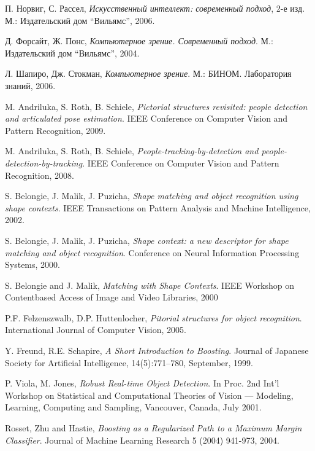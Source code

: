 \begin{thebibliography}{99}

  П. Норвиг, С. Рассел,
  \emph{Искусственный интеллект: современный подход}, 2-е изд.
  М.: Издательский дом ``Вильямс'',
  2006.

  Д. Форсайт, Ж. Понс,
  \emph{Компьютерное зрение. Современный подход}.
  М.: Издательский дом ``Вильямс'',
  2004.

  Л. Шапиро, Дж. Стокман,
  \emph{Компьютерное зрение}.
  М.: БИНОМ. Лаборатория знаний,
  2006.

  M. Andriluka, S. Roth, B. Schiele,
  \emph{Pictorial structures revisited: people detection and articulated pose estimation}.
  IEEE Conference on Computer Vision and Pattern Recognition,
  2009.

  M. Andriluka, S. Roth, B. Schiele,
  \emph{People-tracking-by-detection and people-detection-by-tracking}.
  IEEE Conference on Computer Vision and Pattern Recognition,
  2008.

  S. Belongie, J. Malik, J. Puzicha,
  \emph{Shape matching and object recognition using shape contexts}.
  IEEE Transactions on Pattern Analysis and Machine Intelligence,
  2002.

  S. Belongie, J. Malik, J. Puzicha,
  \emph{Shape context: a new descriptor for shape matching and object recognition}.
  Conference on Neural Information Processing Systems,
  2000.

  S. Belongie and J. Malik,
  \emph{Matching with Shape Contexts}.
  IEEE Workshop on Contentbased Access of Image and Video Libraries,
  2000

  P.F. Felzenszwalb, D.P. Huttenlocher,
  \emph{Pitorial structures for object recognition}.
  International Journal of Computer Vision,
  2005.

  Y. Freund, R.E. Schapire,
  \emph{A Short Introduction to Boosting}.
  Journal of Japanese Society for Artificial Intelligence, 14(5):771--780, September,
  1999.

  P. Viola, M. Jones,
  \emph{Robust Real-time Object Detection}.
  In Proc. 2nd Int'l Workshop on Statistical and Computational Theories of Vision --- Modeling, Learning, Computing and Sampling, Vancouver, Canada,
  July 2001.

  Rosset, Zhu and Hastie,
  \emph{Boosting as a Regularized Path to a Maximum Margin Classifier}.
  Journal of Machine Learning Research 5 (2004) 941-973,
  2004.


\end{thebibliography}
